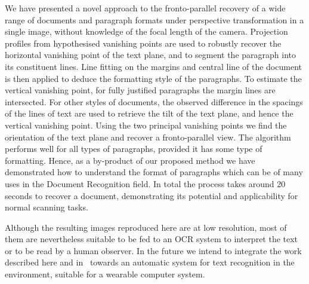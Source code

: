 \documentclass{elsart}   %
\begin{document}
We have presented a novel approach to the fronto-parallel recovery of a wide
range of documents and paragraph formats under perspective transformation in a
single image, without knowledge of the focal length of the camera.  Projection
profiles from hypothesised vanishing points are used to robustly recover the
horizontal vanishing point of the text plane, and to segment the paragraph into
its constituent lines.  Line fitting on the margins and central line of the
document is then applied to deduce the formatting style of the paragraphs.  To
estimate the vertical vanishing point, for fully justified paragraphs the margin
lines are intersected.  For other styles of documents, the observed difference
in the spacings of the lines of text are used to retrieve the tilt of the text
plane, and hence the vertical vanishing point.  Using the two principal
vanishing points we find the orientation of the text plane and recover a
fronto-parallel view.  The algorithm performs well for all types of paragraphs,
provided it has some type of formatting. Hence, as a by-product of our proposed
method we have demonstrated how to understand the format of paragraphs which can 
be of many uses in the Document Recognition field.
In total the process takes around 20 seconds to recover a document,
demonstrating its potential and applicability 
for normal scanning tasks.


Although the resulting images reproduced here are at low resolution, most of
them are nevertheless suitable to be fed to an OCR system to interpret the text
or to be read by a human observer. 
In the future we intend to integrate the work described here and
in~\cite{justin} towards an automatic system for text recognition in the
environment, suitable for a wearable computer system. 




\end{document}
